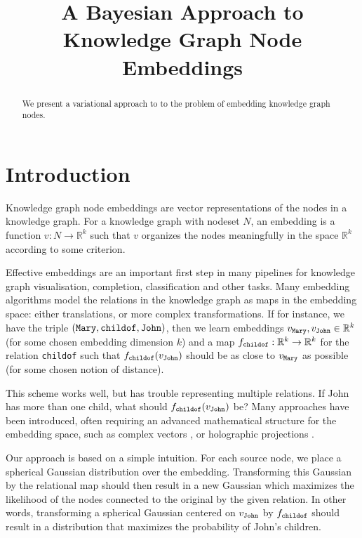 \documentclass[11pt]{article}
\title{A Bayesian Approach to Knowledge Graph Node Embeddings}
\begin{document}
\newcommand{\R}{{\mathbb R}}
\newcommand{\fw}[1]{\text{\texttt{#1}}}

\maketitle

\begin{abstract}

	We present a variational approach to to the problem of embedding knowledge graph nodes.
\end{abstract}	

\section{Introduction}
Knowledge graph node embeddings are vector representations of the nodes in a knowledge graph. For a knowledge graph with nodeset $N$, an embedding is a function $v: N \to \R^k$ such that $v$ organizes the nodes meaningfully in the space $\R^k$ according to some criterion.

Effective embeddings are an important first step in many pipelines for knowledge graph visualisation, completion, classification and other tasks. Many embedding algorithms model the relations in the knowledge graph as maps in the embedding space: either translations, or more complex transformations. If for instance, we have the triple $(\fw{Mary}, \fw{childof}, \fw{John})$, then we learn embeddings $v_\fw{Mary}, v_\fw{John} \in \R^k$  (for some chosen embedding dimension $k$) and a map $f_\fw{childof} : \R^k \to \R^k$ for the relation \texttt{childof} such that $f_\fw{childof}(v_\fw{John})$ should be as close to $v_\fw{Mary}$ as possible (for some chosen notion of distance).

This scheme works well, but has trouble representing multiple relations. If John has more than one child, what should $f_\fw{childof}(v_\fw{John})$ be? Many approaches have been introduced, often requiring an advanced mathematical structure for the embedding space, such as complex vectors \cite{trouillon2016complex}, or holographic projections \cite{nickel2016holographic}.

Our approach is based on a simple intuition. For each source node, we place a spherical Gaussian distribution over the embedding. Transforming this Gaussian by the relational map should then result in a new Gaussian which maximizes the likelihood of the nodes connected to the original by the given relation.\footnotemark
{} In other words, transforming a spherical Gaussian centered on $v_\fw{John}$ by $f_\fw{childof}$ should result in a distribution that maximizes the probability of John's children.
\end{document}
